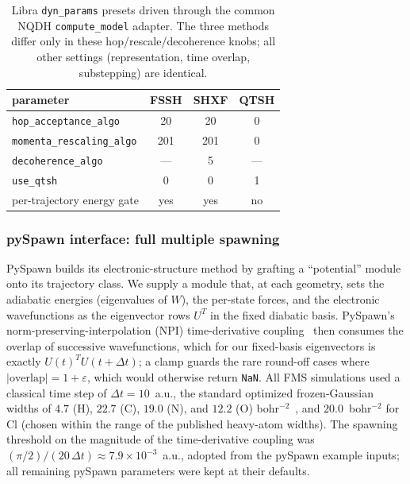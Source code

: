 \documentclass[11pt]{article}
\begin{document}
\begin{table}[ht]
  \centering
  \small
  \begin{tabular}{lccc}
    \toprule
    parameter & FSSH & SHXF & QTSH \\
    \midrule
    \texttt{hop\_acceptance\_algo}   & 20  & 20  & 0 \\
    \texttt{momenta\_rescaling\_algo}& 201 & 201 & 0 \\
    \texttt{decoherence\_algo}       & --- & 5   & --- \\
    \texttt{use\_qtsh}               & 0   & 0   & 1 \\
    per-trajectory energy gate       & yes & yes & no \\
    \bottomrule
  \end{tabular}
  \caption{Libra \texttt{dyn\_params} presets driven through the common NQDH
  \texttt{compute\_model} adapter. The three methods differ only in these
  hop/rescale/decoherence knobs; all other settings (representation, time
  overlap, substepping) are identical.}
  \label{tab:presets}
\end{table}

\subsubsection{pySpawn interface: full multiple spawning}
PySpawn builds its electronic-structure method by grafting a ``potential'' module onto its trajectory class. We supply a module that, at each geometry, sets the adiabatic energies (eigenvalues of $W$), the per-state forces, and the electronic wavefunctions as the eigenvector rows $U^{T}$ in the fixed diabatic basis. PySpawn's norm-preserving-interpolation (NPI) time-derivative coupling~\cite{meek2014evaluation} then consumes the overlap of successive wavefunctions, which for our fixed-basis eigenvectors is exactly $U(t)^{T}U(t{+}\Delta t)$; a clamp guards the rare round-off cases where $|\text{overlap}| = 1+\varepsilon$, which would otherwise return \texttt{NaN}. All FMS simulations used a classical time step of $\Delta t = 10$~a.u., the standard optimized frozen-Gaussian widths of $4.7$ (H), $22.7$ (C), $19.0$ (N), and $12.2$ (O) bohr$^{-2}$~\cite{thompson2010optimization}, and $20.0$~bohr$^{-2}$ for Cl (chosen within the range of the published heavy-atom widths). The spawning threshold on the magnitude of the time-derivative coupling was $(\pi/2)/(20\,\Delta t) \approx 7.9\times10^{-3}$~a.u., adopted from the pySpawn example inputs; all remaining pySpawn parameters were kept at their defaults.
\end{document}
